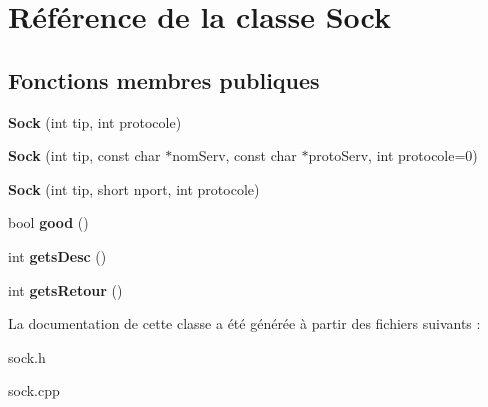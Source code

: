 \hypertarget{class_sock}{\section{Référence de la classe Sock}
\label{class_sock}
}
\subsection*{Fonctions membres publiques}
\begin{DoxyCompactItemize}
\item 
\hypertarget{class_sock_a88c9112bb9779f1eac3c119dd988ea1a}{{\bfseries Sock} (int tip, int protocole)}\label{class_sock_a88c9112bb9779f1eac3c119dd988ea1a}

\item 
\hypertarget{class_sock_ac5a7483c57b83f543ffe6e9597f71de0}{{\bfseries Sock} (int tip, const char $\ast$nom\-Serv, const char $\ast$proto\-Serv, int protocole=0)}\label{class_sock_ac5a7483c57b83f543ffe6e9597f71de0}

\item 
\hypertarget{class_sock_ae3048545d248c024a3e4c47304e6275b}{{\bfseries Sock} (int tip, short nport, int protocole)}\label{class_sock_ae3048545d248c024a3e4c47304e6275b}

\item 
\hypertarget{class_sock_a7663f862e18f61152bda5323006c581e}{bool {\bfseries good} ()}\label{class_sock_a7663f862e18f61152bda5323006c581e}

\item 
\hypertarget{class_sock_a3e90d180f9a6e1fee08de1c51d8575a6}{int {\bfseries gets\-Desc} ()}\label{class_sock_a3e90d180f9a6e1fee08de1c51d8575a6}

\item 
\hypertarget{class_sock_ae741cb4ee4feb54af9775e7579dcc615}{int {\bfseries gets\-Retour} ()}\label{class_sock_ae741cb4ee4feb54af9775e7579dcc615}

\end{DoxyCompactItemize}


La documentation de cette classe a été générée à partir des fichiers suivants \-:\begin{DoxyCompactItemize}
\item 
sock.\-h\item 
sock.\-cpp\end{DoxyCompactItemize}
